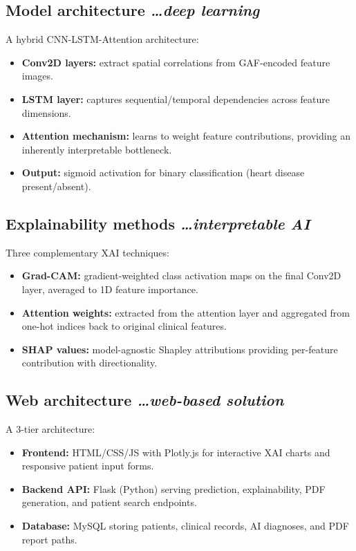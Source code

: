 \documentclass[11pt,a4paper]{article}
\newcommand{\BvrHint}[1]{%
  {\normalfont\normalsize\itshape\hfill #1}}
\begin{document}
\subsection{Model architecture%
  \BvrHint{\ldots deep learning}}
A hybrid CNN-LSTM-Attention architecture:
\begin{itemize}[leftmargin=0.7cm]
    \item \textbf{Conv2D layers:} extract spatial correlations from
      GAF-encoded feature images.
    \item \textbf{LSTM layer:} captures sequential/temporal
      dependencies across feature dimensions.
    \item \textbf{Attention mechanism:} learns to weight feature
      contributions, providing an inherently interpretable
      bottleneck.
    \item \textbf{Output:} sigmoid activation for binary
      classification (heart disease present/absent).
\end{itemize}

\subsection{Explainability methods%
  \BvrHint{\ldots interpretable AI}}
Three complementary XAI techniques:
\begin{itemize}[leftmargin=0.7cm]
    \item \textbf{Grad-CAM:} gradient-weighted class activation maps
      on the final Conv2D layer, averaged to 1D feature importance.
    \item \textbf{Attention weights:} extracted from the attention
      layer and aggregated from one-hot indices back to original
      clinical features.
    \item \textbf{SHAP values:} model-agnostic Shapley attributions
      providing per-feature contribution with directionality.
\end{itemize}

\subsection{Web architecture%
  \BvrHint{\ldots web-based solution}}
A 3-tier architecture:
\begin{itemize}[leftmargin=0.7cm]
    \item \textbf{Frontend:} HTML/CSS/JS with Plotly.js for
      interactive XAI charts and responsive patient input forms.
    \item \textbf{Backend API:} Flask (Python) serving prediction,
      explainability, PDF generation, and patient search endpoints.
    \item \textbf{Database:} MySQL storing patients, clinical
      records, AI diagnoses, and PDF report paths.
\end{itemize}
\end{document}
